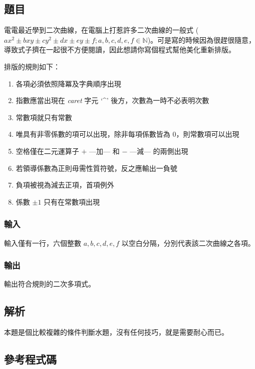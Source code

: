 \documentclass[a4paper,10pt]{article}
\begin{document}
\subsection{題目}

電電最近學到二次曲線，在電腦上打惹許多二次曲線的一般式 ($ax^2 \pm bxy \pm cy^2 \pm dx \pm ey \pm f; a, b, c, d, e, f \in \mathbb{N}$)。可是寫的時候因為很趕很隨意，導致式子擠在一起很不方便閱讀，因此想請你寫個程式幫他美化重新排版。

排版的規則如下：
\begin{enumerate}
 \item 各項必須依照降冪及字典順序出現
 \item 指數應當出現在 \textit{caret} 字元 `\enspace\textbf{\^}' 後方，次數為一時不必表明次數
 \item 常數項就只有常數
 \item 唯具有非零係數的項可以出現，除非每項係數皆為 $0$，則常數項可以出現
 \item 空格僅在二元運算子 $\mathbf{+}$ ---加--- 和 $\mathbf{-}$ ---減--- 的兩側出現
 \item 若領導係數為正則毋需性質符號，反之應輸出一負號
 \item 負項被視為減去正項，首項例外
 \item 係數 $\pm1$ 只有在常數項出現
\end{enumerate}

\subsubsection{輸入}

輸入僅有一行，六個整數 $a, b, c, d, e, f$ 以空白分隔，分別代表該二次曲線之各項。

\subsubsection{輸出}

輸出符合規則的二次多項式。

\subsection{解析}

本題是個比較複雜的條件判斷水題，沒有任何技巧，就是需要耐心而已。

\subsection{參考程式碼}
\end{document}
